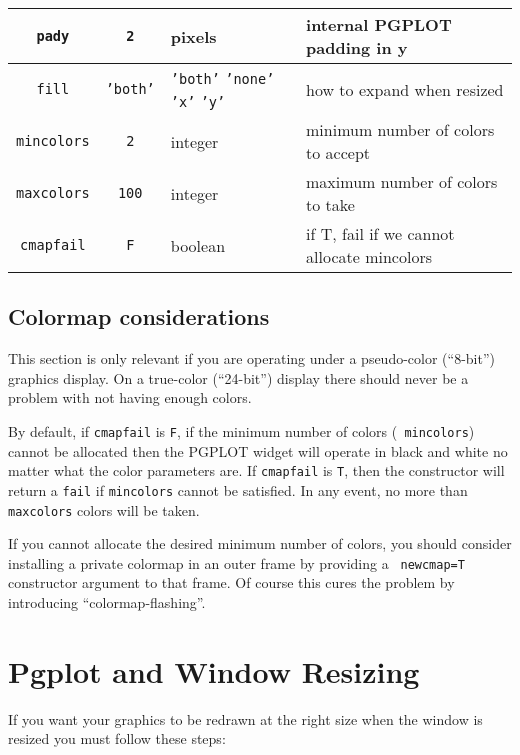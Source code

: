 \begin{table}[tbh]
{\begin{center}
\begin{tabular}{|c|c|p{1.7in}|p{1.8in}|}
{\tt pady} & {\tt 2}       & pixels & internal PGPLOT padding in y \\ \hline
{\tt fill}        & {\tt 'both'}  & {\tt 'both'} {\tt 'none'} {\tt 'x'} {\tt 'y'} & how to expand when resized \\ \hline
{\tt mincolors} & {\tt 2}       & integer & minimum number of colors to accept \\ \hline
{\tt maxcolors} & {\tt 100}     & integer & maximum number of colors to take \\ \hline
{\tt cmapfail}  & {\tt F}       & boolean & if T, fail if we cannot allocate mincolors \\ \hline
\end{tabular}
\end{center}
}
\end{table}


\subsection{Colormap considerations}

This section is only relevant if you are operating under a pseudo-color
(``8-bit'') graphics display. On a true-color (``24-bit'') display there should
never be a problem with not having enough colors.

By default, if {\tt cmapfail} is {\tt F}, if the minimum number of colors ({\tt
mincolors}) cannot be allocated then the PGPLOT widget will operate in black and
white no matter what the color parameters are. If {\tt cmapfail} is {\tt T},
then the constructor will return a {\tt fail} if {\tt mincolors} cannot be
satisfied. In any event, no more than {\tt maxcolors} colors will be taken.

If you cannot allocate the desired minimum number of colors, you should consider
installing a private colormap in an outer frame by providing a {\tt
newcmap=T} constructor argument to that frame. Of course this cures the problem
by introducing ``colormap-flashing''.

\section{Pgplot and Window Resizing}


If you want your graphics to be redrawn at the right size when the
window is resized you must follow these steps:

